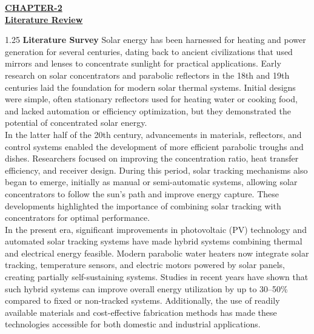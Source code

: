 \begin{center}
  {\fontsize{15}{18}\selectfont \bfseries \textcolor{red!80!black}{\underline{CHAPTER-2}}}\\[2mm]
  {\fontsize{16}{20}\selectfont \bfseries \textcolor{red!80!black}{\underline{Literature Review}}}\\[5mm]
\end{center}

\noindent
\begin{spacing}{1.25}
{\fontsize{10.2}{14.5}\selectfont
\textbf{Literature Survey} Solar energy has been harnessed for heating and power generation for several centuries, dating back to ancient civilizations that used mirrors and lenses to concentrate sunlight for practical applications. Early research on solar concentrators and parabolic reflectors in the 18th and 19th centuries laid the foundation for modern solar thermal systems. Initial designs were simple, often stationary reflectors used for heating water or cooking food, and lacked automation or efficiency optimization, but they demonstrated the potential of concentrated solar energy.\\[3.5mm]
In the latter half of the 20th century, advancements in materials, reflectors, and control systems enabled the development of more efficient parabolic troughs and dishes. Researchers focused on improving the concentration ratio, heat transfer efficiency, and receiver design. During this period, solar tracking mechanisms also began to emerge, initially as manual or semi-automatic systems, allowing solar concentrators to follow the sun's path and improve energy capture. These developments highlighted the importance of combining solar tracking with concentrators for optimal performance.\\[3.5mm]
In the present era, significant improvements in photovoltaic (PV) technology and automated solar tracking systems have made hybrid systems combining thermal and electrical energy feasible. Modern parabolic water heaters now integrate solar tracking, temperature sensors, and electric motors powered by solar panels, creating partially self-sustaining systems. Studies in recent years have shown that such hybrid systems can improve overall energy utilization by up to 30--50\% compared to fixed or non-tracked systems. Additionally, the use of readily available materials and cost-effective fabrication methods has made these technologies accessible for both domestic and industrial applications.\\[3.5mm]
}
\end{spacing}

